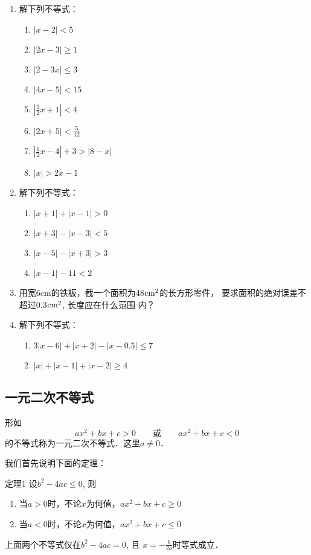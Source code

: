\begin{ex}
\begin{enumerate}
    \item 解下列不等式：
\begin{multicols}{2}
\begin{enumerate}
    \item $|x-2|<5$
    \item $|2x-3|\ge 1$
    \item $|2-3x|\le 3$
    \item $|4x-5|<15$
    \item $\left|\frac{1}{2}x+1\right|<4$
    \item $|2x+5|<\frac{5}{12}$
    \item $\left|\frac{1}{2}x-4\right|+3>|8-x|$
    \item $|x|>2x-1$
\end{enumerate}    
\end{multicols}

\item 解下列不等式：
\begin{multicols}{2}
\begin{enumerate}
    \item $|x+1|+|x-1|>0$
    \item $|x+3|-|x-3|<5$
    \item $|x-5|-|x+3|>3$
    \item $|x-1|-11<2$
\end{enumerate}
\end{multicols}
\item 用宽6cm的铁板，截一个面积为48${\rm cm}^2$的长方形零件，
要求面积的绝对误差不超过0.3${\rm cm}^2$, 长度应在什么范围
内？
\item 解下列不等式：
\begin{enumerate}
    \item $3|x-6|+|x+2|-|x-0.5|\le 7$
    \item $|x|+|x-1|+|x-2|\ge 4$
\end{enumerate}
\end{enumerate}
\end{ex}

\subsection{一元二次不等式}
形如
\[ax^2+bx+c>0 \qquad \text{或}\qquad  ax^2+bx+c<0 \]
的不等式称为一元二次不等式．这里$a\ne 0$．

我们首先说明下面的定理：
\begin{blk}{定理1}
    设$b^2-4ac\le 0$, 则
\begin{enumerate}
    \item 当$a>0$时，不论$x$为何值，$ax^2+bx+c\ge 0$
    \item 当$a<0$时，不论$x$为何值，$ax^2+bx+c\le 0$
\end{enumerate} 
上面两个不等式仅在$b^2-4ac=0$, 且
$x=-\frac{b}{2a}$时等式成立．
\end{blk}

